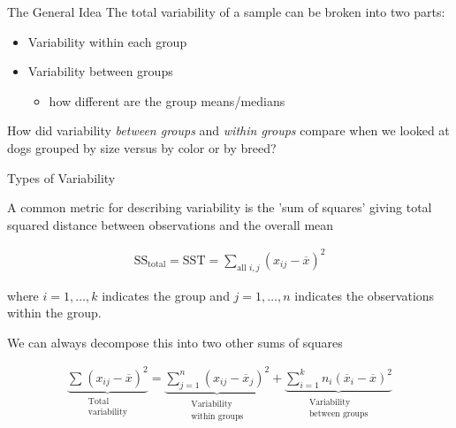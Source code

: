 \documentclass{beamer}
\newcommand{\vp}{\vspace{2mm}}
\begin{document}
\begin{frame}{The General Idea}
\large
The total variability of a sample can be broken into two parts:

\begin{itemize}
\item Variability within each group
\item Variability between groups
    \begin{itemize}
        \item how different are the group means/medians
    \end{itemize}
\end{itemize}
\vp \vspace{6mm}

How did variability \textit{between groups} and \textit{within groups} compare when we looked at dogs grouped by size versus by color or by breed?

\end{frame}

\begin{frame}{Types of Variability}

A common metric for describing variability is the 'sum of squares' giving total squared distance between observations and the overall mean \vspace{-2mm}

\begin{align*}
\text{SS}_{\text{total}} = \text{SST} = \sum_{\text{all } i,j} (x_{ij} - \overline{x})^2
\end{align*}

where $i = 1, \dots, k$ indicates the group and $j = 1, \dots, n$ indicates the observations within the group. \vspace{4mm}

We can always decompose this into two other sums of squares \vspace{-2mm}

\begin{align*}
\underbrace{\sum_{} (x_{ij} - \overline{x})^2}_{\substack{\text{Total} \\ \text{variability}}} = \underbrace{\sum_{j=1}^n (x_{ij} - \overline{x}_j)^2}_{\substack{\text{Variability} \\ \text{within groups}}} + \underbrace{\sum_{i=1}^k n_i(\overline{x}_i - \overline{x})^2}_{\substack{\text{Variability} \\ \text{between groups}}} 
\end{align*}

\end{frame}
\end{document}
